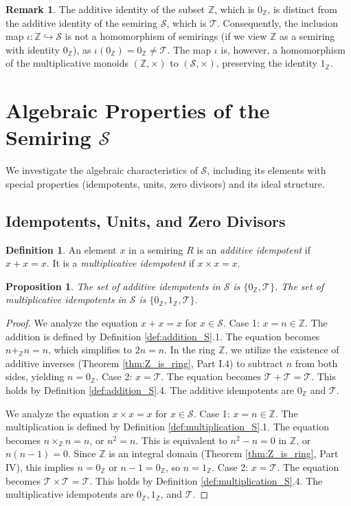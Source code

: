 \documentclass[11pt, a4paper]{article}
\theoremstyle{plain}
\newtheorem{proposition}[theorem]{Proposition}
\theoremstyle{definition}
\newtheorem{definition}[theorem]{Definition}
\newtheorem{remark}[theorem]{Remark}
\numberwithin{equation}{section}
\newcommand{\Z}{\mathbb{Z}}
\newcommand{\Tobj}{\mathcal{T}} %
\newcommand{\SemiringS}{\mathcal{S}}
\begin{document}
\begin{remark}\label{rem:identities_distinct}
The additive identity of the subset $\Z$, which is $0_{\Z}$, is distinct from the additive identity of the semiring $\SemiringS$, which is $\Tobj$. Consequently, the inclusion map $\iota: \Z \hookrightarrow \SemiringS$ is not a homomorphism of semirings (if we view $\Z$ as a semiring with identity $0_{\Z}$), as $\iota(0_{\Z})=0_{\Z} \neq \Tobj$. The map $\iota$ is, however, a homomorphism of the multiplicative monoids $(\Z, \times)$ to $(\SemiringS, \times)$, preserving the identity $1_{\Z}$.
\end{remark}

\section{Algebraic Properties of the Semiring \texorpdfstring{$\SemiringS$}{S}}

We investigate the algebraic characteristics of $\SemiringS$, including its elements with special properties (idempotents, units, zero divisors) and its ideal structure.

\subsection{Idempotents, Units, and Zero Divisors}

\begin{definition}
An element $x$ in a semiring $R$ is an \emph{additive idempotent} if $x+x=x$. It is a \emph{multiplicative idempotent} if $x\times x=x$.
\end{definition}

\begin{proposition}\label{prop:idempotents}
The set of additive idempotents in $\SemiringS$ is $\{0_{\Z}, \Tobj\}$. The set of multiplicative idempotents in $\SemiringS$ is $\{0_{\Z}, 1_{\Z}, \Tobj\}$.
\end{proposition}
\begin{proof}
We analyze the equation $x+x=x$ for $x \in \SemiringS$.
Case 1: $x=n \in \Z$. The addition is defined by Definition \ref{def:addition_S}.1. The equation becomes $n+_{\Z} n = n$, which simplifies to $2n=n$. In the ring $\Z$, we utilize the existence of additive inverses (Theorem \ref{thm:Z_is_ring}, Part I.4) to subtract $n$ from both sides, yielding $n=0_{\Z}$.
Case 2: $x=\Tobj$. The equation becomes $\Tobj+\Tobj = \Tobj$. This holds by Definition \ref{def:addition_S}.4.
The additive idempotents are $0_{\Z}$ and $\Tobj$.

We analyze the equation $x\times x=x$ for $x \in \SemiringS$.
Case 1: $x=n \in \Z$. The multiplication is defined by Definition \ref{def:multiplication_S}.1. The equation becomes $n\times_{\Z} n = n$, or $n^2=n$. This is equivalent to $n^2-n=0$ in $\Z$, or $n(n-1)=0$. Since $\Z$ is an integral domain (Theorem \ref{thm:Z_is_ring}, Part IV), this implies $n=0_{\Z}$ or $n-1=0_{\Z}$, so $n=1_{\Z}$.
Case 2: $x=\Tobj$. The equation becomes $\Tobj\times\Tobj = \Tobj$. This holds by Definition \ref{def:multiplication_S}.4.
The multiplicative idempotents are $0_{\Z}, 1_{\Z}$, and $\Tobj$.
\end{proof}
\end{document}
